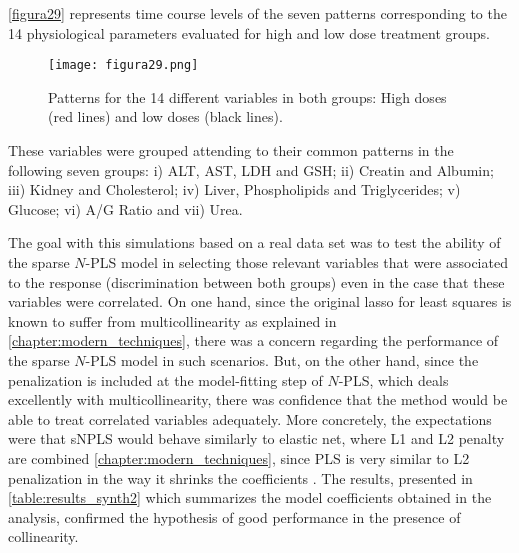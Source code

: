 \autoref{figura29} represents time course levels of the seven patterns corresponding to the 14 physiological parameters evaluated for high and low dose treatment groups. 

\begin{figure}[hbtp]
	\centering
\texttt{[image: figura29.png]}
\caption[Patterns for the 14 different variables in the data driven synthetic data set]{Patterns for the 14 different variables in both groups: High doses (red lines) and low doses (black lines).}
\label{figura29}
\end{figure}

These variables were grouped attending to their common patterns in the following seven groups: i) ALT, AST, LDH and GSH; ii) Creatin and Albumin; iii) Kidney and Cholesterol; iv) Liver, Phospholipids and Triglycerides; v) Glucose; vi) A/G Ratio and vii) Urea.

The goal with this simulations based on a real data set was to test the ability of the sparse $N$-PLS model in selecting those relevant variables that were associated to the response (discrimination between both groups) even in the case that these variables were correlated. On one hand, since the original lasso for least squares is known to suffer from multicollinearity as explained in \autoref{chapter:modern_techniques}, there was a concern regarding the performance of the sparse $N$-PLS model in such scenarios. But, on the other hand, since the penalization is included at the model-fitting step of $N$-PLS, which deals excellently with multicollinearity, there was confidence that the method would be able to treat correlated variables adequately. More concretely, the expectations were that sNPLS would behave similarly to elastic net, where L1 and L2 penalty are combined \autoref{chapter:modern_techniques}, since PLS is very similar to L2 penalization in the way it shrinks the coefficients \parencite{de1995pls}. The results, presented in \autoref{table:results_synth2} which summarizes the model coefficients obtained in the analysis, confirmed the hypothesis of good performance in the presence of collinearity. 

